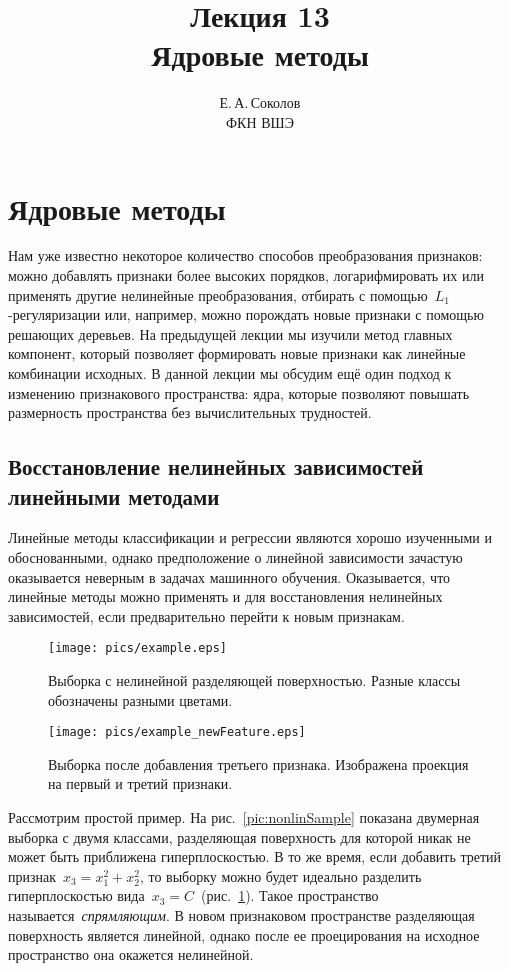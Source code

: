 \documentclass[12pt,fleqn]{article}
\begin{document}
\title{Лекция 13\\Ядровые методы}
\author{Е.\,А.\,Соколов\\ФКН ВШЭ}
\maketitle

\section{Ядровые методы}

Нам уже известно некоторое количество способов преобразования признаков:
можно добавлять признаки более высоких порядков, логарифмировать их или применять
другие нелинейные преобразования, отбирать с помощью~$L_1$-регуляризации
или, например, можно порождать новые признаки с помощью решающих деревьев.
На предыдущей лекции мы изучили метод главных компонент, который позволяет
формировать новые признаки как линейные комбинации исходных.
В данной лекции мы обсудим ещё один подход к изменению признакового пространства:
ядра, которые позволяют повышать размерность пространства без вычислительных трудностей.

\subsection{Восстановление нелинейных зависимостей линейными методами}
Линейные методы классификации и регрессии являются хорошо изученными
и обоснованными, однако предположение о линейной зависимости
зачастую оказывается неверным в задачах машинного обучения.
Оказывается, что линейные методы можно применять и для восстановления
нелинейных зависимостей, если предварительно перейти к новым признакам.

\begin{figure}[t]
\centering
\begin{multicols}{2}
    \hfill
    \texttt{[image: pics/example.eps]}
    \hfill
    \caption{Выборка с нелинейной разделяющей поверхностью.
        Разные классы обозначены разными цветами.}
    \label{pic:nonlinSample}
    \hfill
    \texttt{[image: pics/example\_newFeature.eps]}
    \hfill
    \caption{Выборка после добавления третьего признака.
        Изображена проекция на первый и третий признаки.}
    \label{pic:nonlinSample_ext}
\end{multicols}
\end{figure}

Рассмотрим простой пример.
На рис.~\ref{pic:nonlinSample} показана двумерная выборка с двумя классами,
разделяющая поверхность для которой никак не может быть приближена гиперплоскостью.
В то же время, если добавить третий признак~$x_3 = x_1^2 + x_2^2$,
то выборку можно будет идеально разделить гиперплоскостью
вида~$x_3 = C$~(рис.~\ref{pic:nonlinSample_ext}).
Такое пространство называется~\emph{спрямляющим}.
В новом признаковом пространстве разделяющая поверхность является
линейной, однако после ее проецирования на исходное пространство
она окажется нелинейной.
\end{document}
